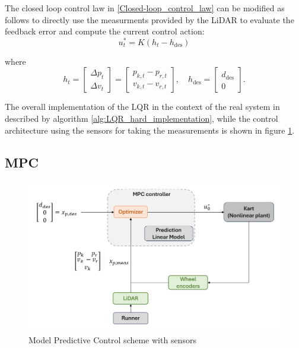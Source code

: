 \documentclass[a4paper,12pt,oneside]{book}
\begin{document}
\bigskip
The closed loop control law in \eqref{Closed-loop_control_law} can be modified as follows to directly use the measurments provided by the LiDAR to evaluate the feedback error and compute the current control action:
\begin{equation}
    u_t^* = K (h_t - h_{\text{des}})
\label{Closed-loop_control_law_sensors}
\end{equation}

where 
\begin{equation}
    h_t =
    \begin{bmatrix}
        \Delta p_t  \\
        \Delta v_t
    \end{bmatrix}
	=
    \begin{bmatrix}
        p_{k,t} - p_{r,t} \\
        v_{k,t} - v_{r,t}
    \end{bmatrix},
    \quad
    h_{\text{des}} =
    \begin{bmatrix}
        d_{\text{des}} \\
        0
    \end{bmatrix}.
\end{equation}

The overall implementation of the LQR in the context of the real system in described by algorithm \ref{alg:LQR_hard_implementation}, while the control architecture using the sensors for taking the measurements is shown in figure \ref{image:MPC_hard_scheme}.

\subsection*{MPC}
\begin{figure}[h!]
	\centering
	\includegraphics[width=1.0\textwidth]{MPC_hard_scheme.png}
	\caption{Model Predictive Control scheme with sensors}
	\label{image:MPC_hard_scheme}
\end{figure}
\end{document}
